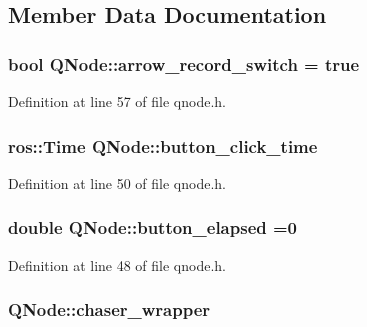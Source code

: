 \subsection{Member Data Documentation}
\subsubsection[{\texorpdfstring{arrow\+\_\+record\+\_\+switch}{arrow_record_switch}}]{\setlength{\rightskip}{0pt plus 5cm}bool Q\+Node\+::arrow\+\_\+record\+\_\+switch = true}\hypertarget{class_q_node_ada91a6275708099206c452df47210045}{}\label{class_q_node_ada91a6275708099206c452df47210045}


Definition at line 57 of file qnode.\+h.

\subsubsection[{\texorpdfstring{button\+\_\+click\+\_\+time}{button_click_time}}]{\setlength{\rightskip}{0pt plus 5cm}ros\+::\+Time Q\+Node\+::button\+\_\+click\+\_\+time}\hypertarget{class_q_node_a96e6599c14732ded065ae6a5b004f872}{}\label{class_q_node_a96e6599c14732ded065ae6a5b004f872}


Definition at line 50 of file qnode.\+h.

\subsubsection[{\texorpdfstring{button\+\_\+elapsed}{button_elapsed}}]{\setlength{\rightskip}{0pt plus 5cm}double Q\+Node\+::button\+\_\+elapsed =0}\hypertarget{class_q_node_a2893bbeba854c1cc89d2271804325b7b}{}\label{class_q_node_a2893bbeba854c1cc89d2271804325b7b}


Definition at line 48 of file qnode.\+h.

\subsubsection[{\texorpdfstring{chaser\+\_\+wrapper}{chaser_wrapper}}]{ Q\+Node\+::chaser\+\_\+wrapper}\hypertarget{class_q_node_ad2d828488fb632a008c7d3ee0e1d1fa2}{}\label{class_q_node_ad2d828488fb632a008c7d3ee0e1d1fa2}


